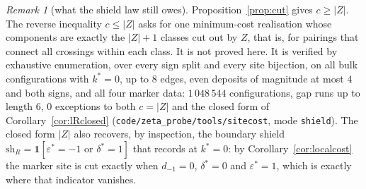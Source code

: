 \documentclass[11pt]{article}
\theoremstyle{plain}
\theoremstyle{definition}
\theoremstyle{remark}
\newtheorem{remark}[theorem]{Remark}
\begin{document}
\begin{remark}[what the shield law still owes]\label{rem:shieldowes}
Proposition~\ref{prop:cut} gives $c\ge|Z|$. The reverse inequality $c\le|Z|$ asks for one
minimum-cost realisation whose components are exactly the $|Z|+1$ classes cut out by $Z$, that is,
for pairings that connect all crossings within each class. It is not proved here. It is verified by
exhaustive enumeration, over every sign split and every site bijection, on all bulk configurations
with $k^\ast=0$, up to $8$ edges, even deposits of magnitude at most $4$ and both signs, and all
four marker data: $1\,048\,544$ configurations, gap runs up to length $6$, $0$ exceptions to both
$c=|Z|$ and the closed form of Corollary~\ref{cor:lRclosed}
(\texttt{code/zeta\_probe/tools/sitecost}, mode \texttt{shield}). The closed form $|Z|$ also recovers, by inspection, the boundary shield
$\mathrm{sh}_R=\mathbf 1[\varepsilon^\ast=-1\text{ or }\delta^\ast=1]$ that
\cite[the explicit transducer]{Bonfioli2026a} records at $k^\ast=0$: by
Corollary~\ref{cor:localcost} the marker site is cut exactly when $d_{-1}=0$, $\delta^\ast=0$ and
$\varepsilon^\ast=1$, which is exactly where that indicator vanishes.
\end{remark}
\end{document}
